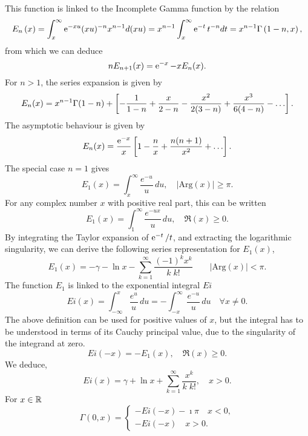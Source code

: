 This function is linked to the Incomplete Gamma function by the relation
\begin{equation*}
  E_n\left( x \right)=\int_{x}^{\infty}
  \operatorname{e}^{ -xu } (xu)^{-n} x^{n-1} d(xu)=x^{n-1} \int_{x}^{\infty}
  \operatorname{e}^{ -t } t^{-n} dt =  x^{n-1}  \Gamma\left( 1-n, x \right), 
\end{equation*}
from which we can deduce
\begin{equation*}
  n E_{n+1}(x)  =   \operatorname{e}^{ -x } - x E_n(x).
\end{equation*}
For $n>1$, the series expansion is given by
\begin{equation*}
  E_n(x)=x^{n-1}
  \Gamma(1-n)+\recaco{-\frac{1}{1-n}+\frac{x}{2-n}-\frac{x^2}{2(3-n)}
    +\frac{x^3}{6(4-n)}-\dots}.     
\end{equation*}
The asymptotic behaviour is given by
\begin{equation*}
  E_n(x)=\frac{\expp{-x}}{x}\recaco{1-\frac{n}{x}+\frac{n(n+1)}{x^2}+\dots}. 
\end{equation*}
The special case $n=1$ gives 
\begin{equation*}
  E_1(x) = \int_x^\infty \frac{e^{-u}}{u}\, du, \quad |\mathrm{Arg}(x)| \ge \pi. 
\end{equation*}
For any complex number $x$ with positive real part, this can be written
\begin{equation*}
  E_1(x) = \int_1^\infty \frac{e^{-ux}}{u}\, du, \quad \Re(x) \ge 0. 
\end{equation*}
By integrating the Taylor expansion of $\operatorname{e}^{ -t }/t$, and extracting the
logarithmic singularity, we can derive the following series representation for
$E_1(x)$, 
\begin{equation*}
  {E_1}(x) =-\gamma-\ln x-\sum_{k=1}^{\infty}\frac{(-1)^k x^k}{k\; k!}
  \qquad |\mathrm{Arg}(x)| < \pi. 
\end{equation*}
The function $E_1$ is linked to the exponential integral $Ei$
\begin{equation*}
  Ei(x)=\int_{-\infty}^x\frac{e^u}u\, du=-\int_{-x}^{\infty}
  \frac{e^{-u}}{u}\, du \quad \forall x \neq 0. 
\end{equation*}
The above definition  can be used for positive values of $x$, but the integral
has to be understood in terms of its Cauchy principal value, due to the
singularity of the integrand at zero.
\begin{equation*}
  {Ei}(-x) = -{E}_1(x) , \quad \Re(x) \ge 0.
\end{equation*}
We deduce, 
\begin{equation*}
  Ei(x) = \gamma + \ln x+ \sum_{k=1}^{\infty} \frac{x^k}{k\; k!}, \quad x>0.
\end{equation*}
For $x \in {\mathbb R}$ 
\begin{equation*}
  \Gamma(0, x)=\left\{
    \begin{array}{l}
      -Ei(-x)-\imath \pi  \quad  x<0, \\
      -Ei(-x) \quad x>0. 
    \end{array}\right.
\end{equation*}

